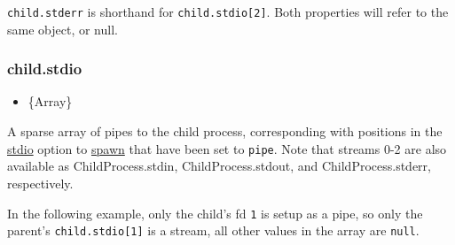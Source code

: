 \texttt{child.stderr} is shorthand for \texttt{child.stdio{[}2{]}}. Both
properties will refer to the same object, or null.

\subsubsection{child.stdio}\label{child.stdio}

\begin{itemize}
\itemsep1pt\parskip0pt
\item
  \{Array\}
\end{itemize}

A sparse array of pipes to the child process, corresponding with
positions in the \hyperref[childux5fprocessux5foptionsux5fstdio]{stdio}
option to
\hyperref[childux5fprocessux5fchildux5fprocessux5fspawnux5fcommandux5fargsux5foptions]{spawn}
that have been set to \texttt{\textquotesingle{}pipe\textquotesingle{}}.
Note that streams 0-2 are also available as ChildProcess.stdin,
ChildProcess.stdout, and ChildProcess.stderr, respectively.

In the following example, only the child's fd \texttt{1} is setup as a
pipe, so only the parent's \texttt{child.stdio{[}1{]}} is a stream, all
other values in the array are \texttt{null}.

\begin{Shaded}
\begin{Highlighting}[]
\NormalTok{(}\NormalTok{, \{}
    \NormalTok{: [}
      \NormalTok{, }
      \NormalTok{, }
      \NormalTok{(}\NormalTok{, }\NormalTok{) }
    \NormalTok{]}
\NormalTok{\});}

\NormalTok{(}\NormalTok{[}\NormalTok{], }\NormalTok{);}
\NormalTok{(}\NormalTok{[}\NormalTok{], }\NormalTok{);}

\NormalTok{(}\NormalTok{);}
\NormalTok{(}\NormalTok{[}\NormalTok{], }\NormalTok{);}

\NormalTok{(}\NormalTok{[}\NormalTok{], }\NormalTok{);}
\NormalTok{(}\NormalTok{[}\NormalTok{], }\NormalTok{);}
\end{Highlighting}
\end{Shaded}

